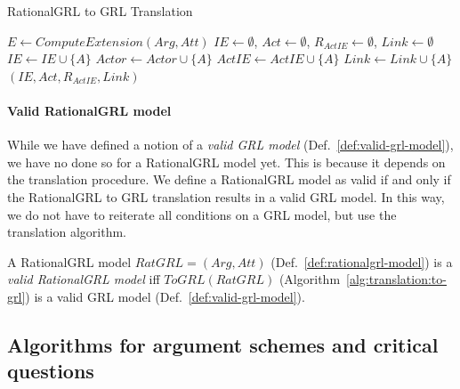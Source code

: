 \begin{algorithm}[h]
  \caption{RationalGRL to GRL Translation}
  \label{alg:translation:to-grl}
  \begin{algorithmic}[1]
    \State $E \leftarrow ComputeExtension(Arg,Att)$\label{alg:translation:to-grl:extension}
    \State $IE\leftarrow\emptyset$, $Act\leftarrow\emptyset$, $R_{ActIE}\leftarrow\emptyset$, $Link\leftarrow \emptyset$
    \label{alg:translation:to-grl:for}
      \label{alg:translation:to-grl:switch}
            \State $IE\leftarrow IE\cup \{A\}$
          \EndCase
            \State $Actor\leftarrow Actor\cup \{A\}$
          \EndCase
            \State $ActIE\leftarrow ActIE\cup \{A\}$
          \EndCase
            \State $Link\leftarrow Link \cup\{A\}$
          \EndCase
      \EndSwitch
    \EndFor
    \State \Return $(IE,Act,R_{ActIE}, Link)$\label{alg:translation:to-grl:return}
    \EndProcedure
  \end{algorithmic}
\end{algorithm}

\paragraph{Valid RationalGRL model} While we have defined a notion of a \emph{valid GRL model} (Def.~\ref{def:valid-grl-model}), we have no  done so for a RationalGRL model yet. This is because it depends on the translation procedure. We define a RationalGRL model as valid if and only if the RationalGRL to GRL translation results in a valid GRL model. In this way, we do not have to reiterate all conditions on a GRL model, but use the translation algorithm.

\begin{definition}
\label{def:valid-rationalgrl-model}
A RationalGRL model $RatGRL = (Arg, Att)$ (Def.~\ref{def:rationalgrl-model})
is a \emph{valid RationalGRL model} iff $ToGRL(RatGRL)$ (Algorithm~\ref{alg:translation:to-grl}) is a valid GRL model (Def.~\ref{def:valid-grl-model}).
\end{definition}

\subsection{Algorithms for argument schemes and critical questions}
\label{sect:algorithms}

